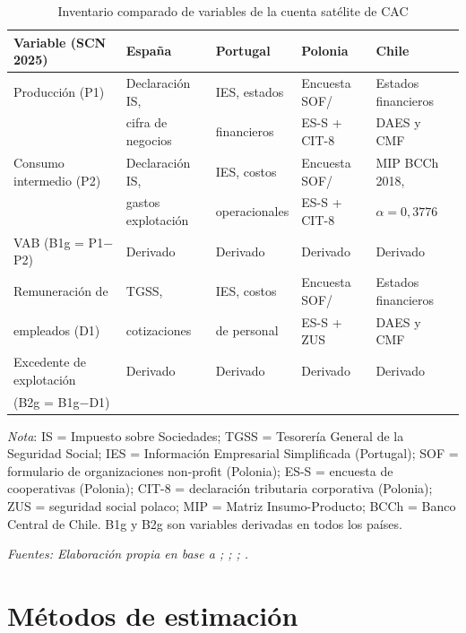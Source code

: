 \begin{table}[htbp]
\centering
\caption{Inventario comparado de variables de la cuenta satélite de CAC}
\label{tab:inventario_variables}
\small
\begin{tabular}{lllll}
\toprule
\textbf{Variable (SCN 2025)} & \textbf{España} & 
\textbf{Portugal} & \textbf{Polonia} & \textbf{Chile} \\
\midrule
Producción (P1) & 
  Declaración IS, & IES, estados & Encuesta SOF/ & 
  Estados financieros \\
  & cifra de negocios & financieros & ES-S + CIT-8 & DAES y CMF \\
\addlinespace
Consumo intermedio (P2) & 
  Declaración IS, & IES, costos & Encuesta SOF/ & 
  MIP BCCh 2018, \\
  & gastos explotación & operacionales & ES-S + CIT-8 & 
  $\alpha = 0{,}3776$ \\
\addlinespace
VAB (B1g = P1$-$P2) & 
  Derivado & Derivado & Derivado & Derivado \\
\addlinespace
Remuneración de & TGSS, & IES, costos & Encuesta SOF/ & 
  Estados financieros \\
empleados (D1) & cotizaciones & de personal & ES-S + ZUS & DAES y CMF \\
\addlinespace
Excedente de explotación & 
  Derivado & Derivado & Derivado & Derivado \\
(B2g = B1g$-$D1) & & & & \\
\bottomrule
\end{tabular}
\begin{tablenotes}
\small
\item \textit{Nota}: IS = Impuesto sobre Sociedades; TGSS = 
Tesorería General de la Seguridad Social; IES = Información 
Empresarial Simplificada (Portugal); SOF = formulario de 
organizaciones non-profit (Polonia); ES-S = encuesta de 
cooperativas (Polonia); CIT-8 = declaración tributaria corporativa 
(Polonia); ZUS = seguridad social polaco; MIP = Matriz 
Insumo-Producto; BCCh = Banco Central de Chile. 
B1g y B2g son variables derivadas en todos los países.
\item \textit{Fuentes: Elaboración propia en base a 
\cite{barea_tejeiro_manual_2007}; 
; 
\cite{statistics_poland_social_2021}; 
.}
\end{tablenotes}
\end{table}

\newpage
\section{Métodos de estimación}
\label{sec:metodos-estimacion}

